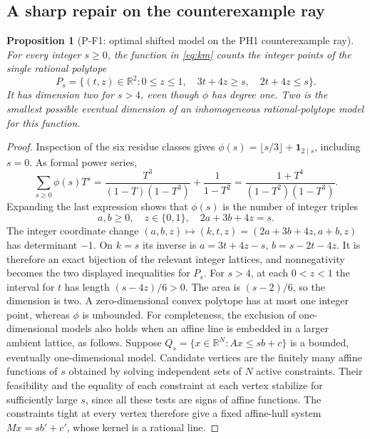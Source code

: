 \documentclass[11pt,a4paper]{article}
\newtheorem{proposition}{Proposition}[section]
\begin{document}
\subsection{A sharp repair on the counterexample ray}

\begin{proposition}[P-F1: optimal shifted model on the PH1 counterexample ray]
\label{prop:shiftedray}
For every integer $s\ge0$, the function in \eqref{eq:km} counts the integer
points of the single rational polytope
\[
 P_s=\{(t,z)\in\mathbb R^2:
 0\le z\le1,\quad 3t+4z\ge s,\quad 2t+4z\le s\}.
 \tag{P-F1}
\]
It has dimension two for $s>4$, even though $\phi$ has degree one.
Two is the smallest possible eventual dimension of an inhomogeneous
rational-polytope model for this function.
\end{proposition}
\begin{proof}
Inspection of the six residue classes gives
$\phi(s)=\lfloor s/3\rfloor+\mathbf1_{2\mid s}$, including $s=0$.
As formal power series,
\[
 \sum_{s\ge0}\phi(s)T^s
 =\frac{T^3}{(1-T)(1-T^3)}+\frac1{1-T^2}
 =\frac{1+T^4}{(1-T^2)(1-T^3)}.
\]
Expanding the last expression shows that $\phi(s)$ is the number of
integer triples
\[
 a,b\ge0,\quad z\in\{0,1\},\quad 2a+3b+4z=s.
\]
The integer coordinate change
$(a,b,z)\mapsto(k,t,z)=(2a+3b+4z,a+b,z)$ has determinant $-1$.
On $k=s$ its inverse is
$a=3t+4z-s$, $b=s-2t-4z$.
It is therefore an exact bijection of the relevant integer lattices,
and nonnegativity becomes the two displayed inequalities for $P_s$.
For $s>4$, at each $0<z<1$ the interval for $t$ has length
$(s-4z)/6>0$. The area is $(s-2)/6$, so the dimension is two.
A zero-dimensional convex polytope has at most one integer point,
whereas $\phi$ is unbounded. For completeness, the exclusion of
one-dimensional models also holds when an affine line is embedded in
a larger ambient lattice, as follows. Suppose
$Q_s=\{x\in\mathbb R^N:Ax\le sb+c\}$ is a bounded, eventually
one-dimensional model. Candidate vertices are the finitely many affine
functions of $s$ obtained by solving independent sets of $N$ active
constraints. Their feasibility and the equality of each constraint at
each vertex stabilize for sufficiently large $s$, since all these tests
are signs of affine functions. The constraints tight at every vertex
therefore give a fixed affine-hull system $Mx=sb'+c'$, whose kernel is
a rational line.


\end{proof}
\end{document}
